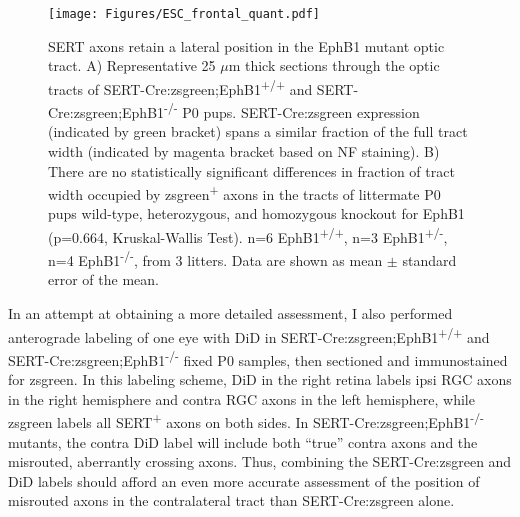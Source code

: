 \begin{figure}[hbtp]
    \begin{center}
        \texttt{[image: Figures/ESC\_frontal\_quant.pdf]}
        \caption[SERT expression is unchanged in EphB1 mutant retinae.]
        {SERT axons retain a lateral position in the EphB1 mutant optic tract.
        A) Representative 25 $\mu$m thick sections through the optic tracts of SERT-Cre:zsgreen;EphB1\textsuperscript{+/+} and SERT-Cre:zsgreen;EphB1\textsuperscript{-/-} P0 pups.
		SERT-Cre:zsgreen expression (indicated by green bracket) spans a similar fraction of the full tract width (indicated by magenta bracket based on NF staining).
		B) There are no statistically significant differences in fraction of tract width occupied by zsgreen\textsuperscript{+} axons in the tracts of littermate P0 pups wild-type, heterozygous, and homozygous knockout for EphB1 (p=0.664, Kruskal-Wallis Test).
        n=6 EphB1\textsuperscript{+/+}, n=3 EphB1\textsuperscript{+/-}, n=4 EphB1\textsuperscript{-/-}, from 3 litters.
        Data are shown as mean $\pm$ standard error of the mean.
        }
        \label{ESC_frontal_quant}
    \end{center}
\end{figure}

In an attempt at obtaining a more detailed assessment, I also performed anterograde labeling of one eye with DiD in SERT-Cre:zsgreen;EphB1\textsuperscript{+/+} and SERT-Cre:zsgreen;EphB1\textsuperscript{-/-} fixed P0 samples, then sectioned and immunostained for zsgreen.
In this labeling scheme, DiD in the right retina labels ipsi RGC axons in the right hemisphere and contra RGC axons in the left hemisphere, while zsgreen labels all SERT\textsuperscript{+} axons on both sides.
In SERT-Cre:zsgreen;EphB1\textsuperscript{-/-} mutants, the contra DiD label will include both ``true'' contra axons and the misrouted, aberrantly crossing axons.
Thus, combining the SERT-Cre:zsgreen and DiD labels should afford an even more accurate assessment of the position of misrouted axons in the contralateral tract than SERT-Cre:zsgreen alone.

